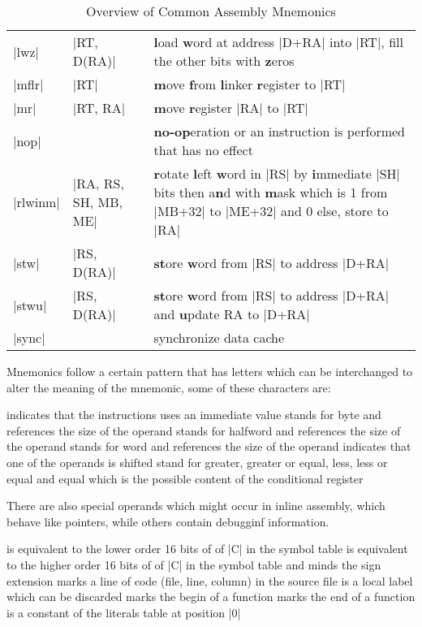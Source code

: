 \begin{table}[htbp]
\begin{tabular}{l l p{9cm}}
    |lwz| & |RT, D(RA)| & \textbf{l}oad \textbf{w}ord at address |D+RA| into |RT|, fill the other bits with \textbf{z}eros \\
    |mflr| & |RT| & \textbf{m}ove \textbf{f}rom \textbf{l}inker \textbf{r}egister to |RT|\\
    |mr| & |RT, RA| & \textbf{m}ove \textbf{r}egister |RA| to |RT| \\
    |nop| & & \textbf{no-op}eration or an instruction is performed that has no effect\\
    |rlwinm| & |RA, RS, SH, MB, ME| & \textbf{r}otate \textbf{l}eft \textbf{w}ord in |RS| by \textbf{i}mmediate |SH| bits then a\textbf{n}d with \textbf{m}ask which is 1 from |MB+32| to |ME+32| and 0 else, store to |RA|\\
    |stw| & |RS, D(RA)| & \textbf{st}ore \textbf{w}ord from |RS| to address |D+RA|\\
    |stwu| & |RS, D(RA)| & \textbf{st}ore \textbf{w}ord from |RS| to address |D+RA| and \textbf{u}pdate RA to |D+RA|\\
    |sync| & & synchronize data cache\\
\end{tabular}
\caption {\label{tab:asm} Overview of Common Assembly Mnemonics}
\end{table}

Mnemonics follow a certain pattern that has letters which can be interchanged to alter the meaning of the mnemonic, some of these characters are:
\begin{description}
     indicates that the instructions uses an immediate value
     stands for byte and references the size of the operand
     stands for halfword and references the size of the operand
     stands for word and references the size of the operand
     indicates that one of the operands is shifted
     stand for greater, greater or equal, less, less or equal and equal which is the possible content of the conditional register
\end{description}

There are also special operands which might occur in inline assembly, which behave like pointers, while others contain debugginf information.
\begin{description}
     is equivalent to the lower order 16 bits of of |C| in the symbol table
     is equivalent to the higher order 16 bits of of |C| in the symbol table and minds the sign extension
     marks a line of code (file, line, column) in the source file
     is a local label which can be discarded
     marks the begin of a function
     marks the end of a function
     is a constant of the literals table at position |0|
\end{description}

\newpage
\listoftodos[Notes]

